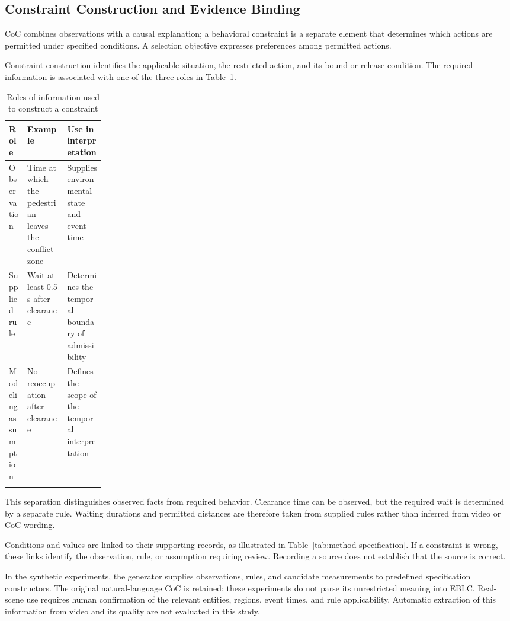 \subsection{Constraint Construction and Evidence Binding}\label{sec:method-evidence}

CoC combines observations with a causal explanation; a behavioral constraint
is a separate element that determines which actions are permitted under
specified conditions. A selection objective expresses preferences among
permitted actions.

Constraint construction identifies the applicable situation, the restricted
action, and its bound or release condition. The required information is
associated with one of the three roles in Table~\ref{tab:method-evidence}.

\begin{table}[tbp]
\caption{Roles of information used to construct a constraint}
\label{tab:method-evidence}
\small
\begin{tabularx}{\linewidth}{@{}>{\raggedright\arraybackslash}p{0.19\linewidth}>{\raggedright\arraybackslash}X>{\raggedright\arraybackslash}X@{}}
\toprule
Role & Example & Use in interpretation\\
\midrule
Observation & Time at which the pedestrian leaves the conflict zone & Supplies environmental state and event time\\[3pt]
Supplied rule & Wait at least 0.5 s after clearance & Determines the temporal boundary of admissibility\\[3pt]
Modeling assumption & No reoccupation after clearance & Defines the scope of the temporal interpretation\\
\botrule
\end{tabularx}
\end{table}

This separation distinguishes observed facts from required behavior. Clearance
time can be observed, but the required wait is determined by a separate rule.
Waiting durations and permitted distances are therefore taken from supplied
rules rather than inferred from video or CoC wording.

Conditions and values are linked to their supporting records, as illustrated
in Table~\ref{tab:method-specification}. If a constraint is wrong, these links
identify the observation, rule, or assumption requiring review. Recording a
source does not establish that the source is correct.

In the synthetic experiments, the generator supplies observations, rules, and
candidate measurements to predefined specification constructors. The original
natural-language CoC is retained; these experiments do not parse its unrestricted
meaning into EBLC. Real-scene use requires human confirmation of the
relevant entities, regions, event times, and rule applicability. Automatic
extraction of this information from video and its quality are not evaluated
in this study.

